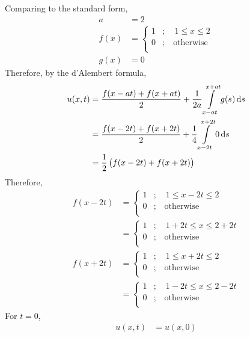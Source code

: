 \documentclass[fleqn, a4paper, 11pt, oneside]{amsart}
\theoremstyle{definition}
\theoremstyle{theorem}
\begin{document}
\begin{solution}
	Comparing to the standard form,
	\begin{align*}
		a &= 2\\
		f(x) &=
			\begin{cases}
				1 & ;\quad 1 \le x \le 2    \\
				0 & ;\quad \text{otherwise} \\
			\end{cases}\\
		g(x) &= 0
	\end{align*}
	Therefore, by the d'Alembert formula,
	\begin{align*}
		u(x,t) & = \frac{f(x - a t) + f(x + a t)}{2} + \frac{1}{2 a} \int\limits_{x - a t}^{x + a t} g(s) \dif s \\
                       & = \frac{f(x - 2 t) + f(x + 2 t)}{2} + \frac{1}{4} \int\limits_{x - 2 t}^{x + 2 t} 0 \dif s      \\
                       & = \frac{1}{2} \left( f(x - 2 t) + f(x + 2 t) \right)
	\end{align*}
	Therefore,
	\begin{align*}
		f(x - 2 t) &=
			\begin{cases}
				1 & ;\quad 1 \le x - 2 t \le 2 \\
				0 & ;\quad \text{otherwise}    \\
			\end{cases}\\
		&=
			\begin{cases}
				1 & ;\quad 1 + 2 t \le x \le 2 + 2 t \\
				0 & ;\quad \text{otherwise}          \\
			\end{cases}\\
		f(x + 2 t) &=
			\begin{cases}
				1 & ;\quad 1 \le x + 2 t \le 2 \\
				0 & ;\quad \text{otherwise}    \\
			\end{cases}\\
		&=
			\begin{cases}
				1 & ;\quad 1 - 2 t \le x \le 2 - 2 t \\
				0 & ;\quad \text{otherwise}          \\
			\end{cases}
	\end{align*}
	For $t = 0$,
	\begin{align*}
		u(x,t) &= u(x,0)\\

\end{align*}
\end{solution}
\end{document}
